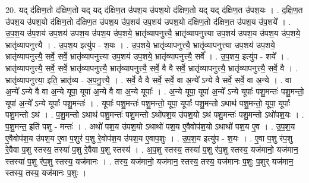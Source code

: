 \documentclass[17pt]{extarticle}
\begin{document}
20. यद् द॑क्षिण॒तो द॑क्षिण॒तो यद् यद् द॑क्षिण॒त उ॑पश॒य उ॑पश॒यो द॑क्षिण॒तो यद् यद् द॑क्षिण॒त उ॑पश॒यः । . द॒क्षि॒ण॒त उ॑पश॒य उ॑पश॒यो द॑क्षिण॒तो द॑क्षिण॒त उ॑पश॒य उ॑प॒शय॑ उप॒शय॑ उपश॒यो द॑क्षिण॒तो द॑क्षिण॒त उ॑पश॒य उ॑प॒शये᳚ । . उ॒प॒श॒य उ॑प॒शय॑ उप॒शय॑ उपश॒य उ॑पश॒य उ॑प॒शये॒ भ्रातृ॑व्यापनुत्त्यै॒ भ्रातृ॑व्यापनुत्त्या उप॒शय॑ उपश॒य उ॑पश॒य उ॑प॒शये॒ भ्रातृ॑व्यापनुत्त्यै । . उ॒प॒श॒य इत्यु॑प - श॒यः । . उ॒प॒शये॒ भ्रातृ॑व्यापनुत्त्यै॒ भ्रातृ॑व्यापनुत्त्या उप॒शय॑ उप॒शये॒ भ्रातृ॑व्यापनुत्त्यै॒ सर्वे॒ सर्वे॒ भ्रातृ॑व्यापनुत्त्या उप॒शय॑ उप॒शये॒ भ्रातृ॑व्यापनुत्त्यै॒ सर्वे᳚ । . उ॒प॒शय॒ इत्यु॑प - शये᳚ । . भ्रातृ॑व्यापनुत्त्यै॒ सर्वे॒ सर्वे॒ भ्रातृ॑व्यापनुत्त्यै॒ भ्रातृ॑व्यापनुत्त्यै॒ सर्वे॒ वै वै सर्वे॒ भ्रातृ॑व्यापनुत्त्यै॒ भ्रातृ॑व्यापनुत्त्यै॒ सर्वे॒ वै । . भ्रातृ॑व्यापनुत्त्या॒ इति॒ भ्रातृ॑व्य - अ॒प॒नु॒त्त्यै॒ । . सर्वे॒ वै वै सर्वे॒ सर्वे॒ वा अ॒न्ये᳚ ऽन्ये वै सर्वे॒ सर्वे॒ वा अ॒न्ये । . वा अ॒न्ये᳚ ऽन्ये वै वा अ॒न्ये यूपा॒ यूपा॑ अ॒न्ये वै वा अ॒न्ये यूपाः᳚ । . अ॒न्ये यूपा॒ यूपा॑ अ॒न्ये᳚ ऽन्ये यूपाः᳚ पशु॒मन्तः॑ पशु॒मन्तो॒ यूपा॑ अ॒न्ये᳚ ऽन्ये यूपाः᳚ पशु॒मन्तः॑ । . यूपाः᳚ पशु॒मन्तः॑ पशु॒मन्तो॒ यूपा॒ यूपाः᳚ पशु॒मन्तो ऽथाथ॑ पशु॒मन्तो॒ यूपा॒ यूपाः᳚ पशु॒मन्तो ऽथ॑ । . प॒शु॒मन्तो ऽथाथ॑ पशु॒मन्तः॑ पशु॒मन्तो ऽथो॑पश॒य उ॑पश॒यो ऽथ॑ पशु॒मन्तः॑ पशु॒मन्तो ऽथो॑पश॒यः । . प॒शु॒मन्त॒ इति॑ पशु - मन्तः॑ । . अथो॑ पश॒य उ॑पश॒यो ऽथाथो॑ पश॒य ए॒वैवोप॑श॒यो ऽथाथो॑ पश॒य ए॒व । . उ॒प॒श॒य ए॒वैवोप॑श॒य उ॑पश॒य ए॒वा प॒शुर॑ प॒शु रे॒वोप॑श॒य उ॑पश॒य ए॒वाप॒शुः । . उ॒प॒श॒य इत्यु॑प - श॒यः । . ए॒वा प॒शु र॑प॒शु रे॒वैवा प॒शु स्तस्य॒ तस्या॑ प॒शु रे॒वैवा प॒शु स्तस्य॑ । . अ॒प॒शु स्तस्य॒ तस्या॑ प॒शु र॑प॒शु स्तस्य॒ यज॑मानो॒ यज॑मान॒ स्तस्या॑ प॒शु र॑प॒शु स्तस्य॒ यज॑मानः । . तस्य॒ यज॑मानो॒ यज॑मान॒ स्तस्य॒ तस्य॒ यज॑मानः प॒शुः प॒शुर् यज॑मान॒ स्तस्य॒ तस्य॒ यज॑मानः प॒शुः । \newline
\end{document}
